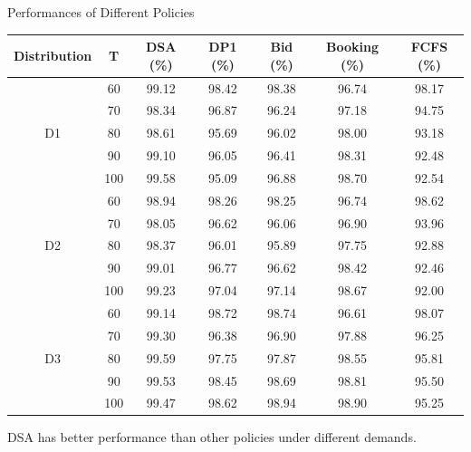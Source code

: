     \begin{frame}{Performances of Different Policies}
        \scriptsize
        \begin{table}[ht]
          \centering
          \begin{tabular}{|c|c|c|c|c|c|c|}
          \hline
          Distribution & T & DSA (\%) & DP1 (\%) & Bid (\%) & Booking (\%) & FCFS (\%) \\
          \hline
          \multirow{5}{*}{D1} & 60   & {\color{red}99.12} & 98.42 & 98.38 & 96.74 & 98.17 \\
          & 70    & {\color{red}98.34} & 96.87 & 96.24 & 97.18 & 94.75 \\
          & 80    & {\color{red}98.61} & 95.69 & 96.02 & 98.00 & 93.18 \\
          & 90    & {\color{red}99.10} & 96.05 & 96.41 & 98.31 & 92.48 \\
          & 100   & {\color{red}99.58} & 95.09 & 96.88 & 98.70 & 92.54 \\
          \hline
          \multirow{5}{*}{D2} & 60   &  {\color{red}98.94} & 98.26 & 98.25 & 96.74 & 98.62 \\
             & 70   & {\color{red}98.05} & 96.62 & 96.06 & 96.90 & 93.96 \\
             & 80   & {\color{red}98.37} & 96.01 & 95.89 & 97.75 & 92.88 \\
             & 90   & {\color{red}99.01} & 96.77 & 96.62 & 98.42 & 92.46 \\
             & 100  & {\color{red}99.23} & 97.04 & 97.14 & 98.67 & 92.00 \\
          \hline
          \multirow{5}{*}{D3} & 60  &  {\color{red}99.14} & 98.72 & 98.74 & 96.61 & 98.07 \\
             & 70  & {\color{red}99.30} & 96.38 & 96.90 & 97.88 & 96.25 \\
             & 80  & {\color{red}99.59} & 97.75 & 97.87 & 98.55 & 95.81 \\
             & 90  & {\color{red}99.53} & 98.45 & 98.69 & 98.81 & 95.50 \\
             & 100 & {\color{red}99.47} & 98.62 & 98.94 & 98.90 & 95.25 \\
          \hline
          \end{tabular}
        \end{table}
        DSA has better performance than other policies under different demands.

    \end{frame}
      
